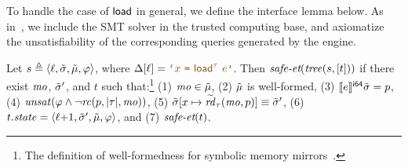 To handle the case of $\textsf{load}$ in general, we define the interface lemma below.
As in~\cite{klee-rocq}, we include the SMT solver in the trusted computing base,
and axiomatize the unsatisfiability of the corresponding queries generated by the \SE engine.

\begin{interfacelemma}
\label{lemma:interface-load}
Let $s \triangleq \langle{\ell},{\tilde\sigma},{\tilde{\mu}},{\varphi}\rangle$,
where \textup{$\instrat{\location} = \codequote{x~\texttt{=}~\tload^{\tau}~e}$}.
Then $\textit{safe-et}(\mathit{tree}(s, [t]))$ if there exist $\mathit{mo}$, $\tilde\sigma'$, and $t$ such that:\footnote{
The definition of well-formedness for symbolic memory mirrors~.
}
(1) $\mathit{mo} \in \tilde{\mu}$,
(2) $\tilde{\mu}$ is well-formed,
(3) \textup{$\llbracket e \rrbracket^{\textsf{i64}}{\tilde\sigma} = p$},
(4) $\mathit{unsat}(\varphi \land \neg \mathit{rc}(p, |\tau|, \mathit{mo}))$,
(5) $\tilde\sigma[x \mapsto \widetilde{\mathit{rd}}_{\tau}(\mathit{mo},p)] \equiv \tilde\sigma'$,
(6) $t.\mathit{state} = \langle{{\ell}{+}1},{\tilde\sigma'},{\tilde{\mu}},{\varphi}\rangle$, and
(7) $\textit{safe-et}(t)$.
\end{interfacelemma}
